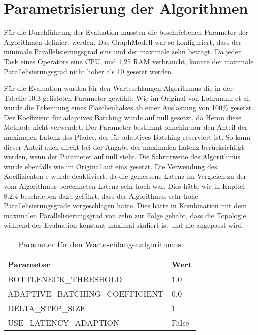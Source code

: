 \section{Parametrisierung der Algorithmen}

Für die Durchführung der Evaluation mussten die beschriebenen Parameter der Algorithmen definiert werden.
Das GraphModell war so konfiguriert, dass der minimale Parallelisierungsgrad eins und der maximale zehn beträgt.
Da jeder Task eines Operators eine CPU, und 1,25 RAM verbraucht, konnte der maximale Parallelisierungsgrad nicht höher als 10 gesetzt werden.

Für die Evaluation wurden für den Warteschlangen-Algorithmus die in der Tabelle 10.3 gelisteten Parameter gewählt.
Wie im Original von Lohrmann et al. wurde die Erkennung eines Flaschenhalses ab einer Auslastung von 100\% gesetzt.
Der Koeffizient für adaptives Batching wurde auf null gesetzt, da Heron diese Methode nicht verwendet.
Der Parameter bestimmt ohnehin nur den Anteil der maximalen Latenz des Pfades, der für adaptives Batching reserviert ist.
So kann dieser Anteil auch direkt bei der Angabe der maximalen Latenz berücksichtigt werden, wenn der Parameter auf null steht.
Die Schrittweite des Algorithmus wurde ebenfalls wie im Original auf eins gesetzt.
Die Verwendung des Koeffizienten e wurde deaktiviert, da die gemessene Latenz im Vergleich zu der vom Algorithmus berechneten Latenz sehr hoch war.
Dies hätte wie in Kapitel 8.2.4 beschrieben dazu geführt, dass der Algorithmus sehr hohe Parallelisierungsgrade vorgeschlagen hätte.
Dies hätte in Kombination mit dem maximalen Parallelisierungsgrad von zehn zur Folge gehabt, dass die Topologie während der Evaluation konstant maximal skaliert ist und nie angepasst wird.

\begin{table}
\caption{Parameter für den Warteschlangenalgorithmus}
\centering
\begin{tabular}{ll}
\hline
\textbf{Parameter} & \textbf{Wert} \\ \hline
BOTTLENECK\_THRESHOLD & 1.0 \\
ADAPTIVE\_BATCHING\_COEFFICIENT & 0.0 \\
DELTA\_STEP\_SIZE & 1 \\
USE\_LATENCY\_ADAPTION & False\\
\hline
\end{tabular}
\end{table}

